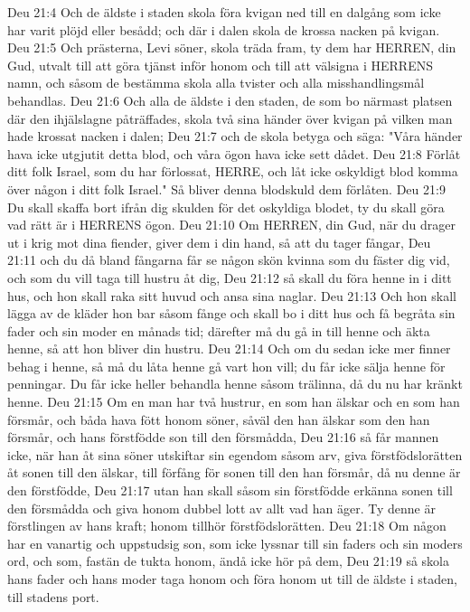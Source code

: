 Deu 21:4  Och de äldste i staden skola föra kvigan ned till en dalgång som icke har varit plöjd eller besådd; och där i dalen skola de krossa nacken på kvigan.
Deu 21:5  Och prästerna, Levi söner, skola träda fram, ty dem har HERREN, din Gud, utvalt till att göra tjänst inför honom och till att välsigna i HERRENS namn, och såsom de bestämma skola alla tvister och alla misshandlingsmål behandlas.
Deu 21:6  Och alla de äldste i den staden, de som bo närmast platsen där den ihjälslagne påträffades, skola två sina händer över kvigan på vilken man hade krossat nacken i dalen;
Deu 21:7  och de skola betyga och säga: "Våra händer hava icke utgjutit detta blod, och våra ögon hava icke sett dådet.
Deu 21:8  Förlåt ditt folk Israel, som du har förlossat, HERRE, och låt icke oskyldigt blod komma över någon i ditt folk Israel." Så bliver denna blodskuld dem förlåten.
Deu 21:9  Du skall skaffa bort ifrån dig skulden för det oskyldiga blodet, ty du skall göra vad rätt är i HERRENS ögon.
Deu 21:10  Om HERREN, din Gud, när du drager ut i krig mot dina fiender, giver dem i din hand, så att du tager fångar,
Deu 21:11  och du då bland fångarna får se någon skön kvinna som du fäster dig vid, och som du vill taga till hustru åt dig,
Deu 21:12  så skall du föra henne in i ditt hus, och hon skall raka sitt huvud och ansa sina naglar.
Deu 21:13  Och hon skall lägga av de kläder hon bar såsom fånge och skall bo i ditt hus och få begråta sin fader och sin moder en månads tid; därefter må du gå in till henne och äkta henne, så att hon bliver din hustru.
Deu 21:14  Och om du sedan icke mer finner behag i henne, så må du låta henne gå vart hon vill; du får icke sälja henne för penningar. Du får icke heller behandla henne såsom trälinna, då du nu har kränkt henne.
Deu 21:15  Om en man har två hustrur, en som han älskar och en som han försmår, och båda hava fött honom söner, såväl den han älskar som den han försmår, och hans förstfödde son till den försmådda,
Deu 21:16  så får mannen icke, när han åt sina söner utskiftar sin egendom såsom arv, giva förstfödslorätten åt sonen till den älskar, till förfång för sonen till den han försmår, då nu denne är den förstfödde,
Deu 21:17  utan han skall såsom sin förstfödde erkänna sonen till den försmådda och giva honom dubbel lott av allt vad han äger. Ty denne är förstlingen av hans kraft; honom tillhör förstfödslorätten.
Deu 21:18  Om någon har en vanartig och uppstudsig son, som icke lyssnar till sin faders och sin moders ord, och som, fastän de tukta honom, ändå icke hör på dem,
Deu 21:19  så skola hans fader och hans moder taga honom och föra honom ut till de äldste i staden, till stadens port.
